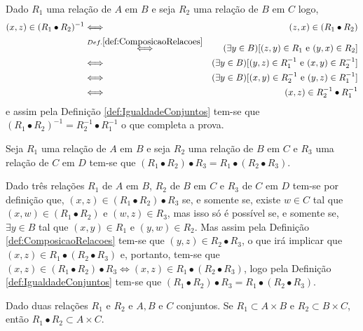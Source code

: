 \begin{prova}
	Dado $R_1$ uma relação de $A$ em $B$ e seja $R_2$ uma relação de $B$ em $C$ logo, 
	\begin{eqnarray*}
		(x, z) \in (R_1 \bullet R_2)^{-1} & \Longleftrightarrow & (z, x) \in (R_1 \bullet R_2)\\
		& \stackrel{Def. \ref{def:ComposicaoRelacoes}}{\Longleftrightarrow }& (\exists y \in B)[(z, y) \in R_1 \text{ e } (y, x) \in R_2]\\
		& \Longleftrightarrow & (\exists y \in B)[(y, z) \in R_1^{-1} \text{ e } (x, y) \in R_2^{-1}]\\
		& \Longleftrightarrow & (\exists y \in B)[(x, y) \in R_2^{-1} \text{ e }(y, z) \in R_1^{-1} ]\\
		& \Longleftrightarrow & (x, z) \in R_2^{-1} \bullet R_1^{-1}
	\end{eqnarray*} 
	e assim pela Definição \ref{def:IgualdadeConjuntos} tem-se que $(R_1 \bullet R_2)^{-1} = R_2^{-1} \bullet R_1^{-1}$ o que completa a prova.
\end{prova}

\begin{teorema}
  Seja $R_1$ uma relação de $A$ em $B$ e seja $R_2$ uma relação de $B$ em $C$ e $R_3$ uma relação de $C$ em $D$ tem-se que $(R_1 \bullet R_2) \bullet R_3 = R_1 \bullet (R_2 \bullet R_3)$.
\end{teorema}

\begin{prova}
	Dado três relações $R_1$ de $A$ em $B$, $R_2$ de $B$ em $C$ e $R_3$ de $C$ em $D$ tem-se por definição que, $(x, z) \in (R_1 \bullet R_2) \bullet R_3$ se, e somente se, existe $w \in C$ tal que $(x, w) \in (R_1 \bullet R_2)$ e $(w, z) \in R_3$, mas isso só é possível se, e somente se, $\exists y \in B$ tal que $(x, y) \in R_1$ e $(y, w) \in R_2$. Mas assim pela Definição \ref{def:ComposicaoRelacoes} tem-se que $(y, z) \in R_2 \bullet R_3$, o que irá implicar que $(x, z) \in R_1 \bullet (R_2 \bullet R_3)$ e, portanto, tem-se que $(x, z) \in (R_1 \bullet R_2) \bullet R_3 \Longleftrightarrow (x, z) \in R_1 \bullet (R_2 \bullet R_3)$, logo pela Definição \ref{def:IgualdadeConjuntos} tem-se que $(R_1 \bullet R_2) \bullet R_3 = R_1 \bullet (R_2 \bullet R_3)$.
\end{prova}

\begin{teorema}
	Dado duas relações $R_1$ e $R_2$ e $A, B$ e $C$ conjuntos. Se $R_1 \subset A \times B$ e $R_2 \subset B \times C$, então $R_1 \bullet R_2 \subset A \times C$.
\end{teorema}

